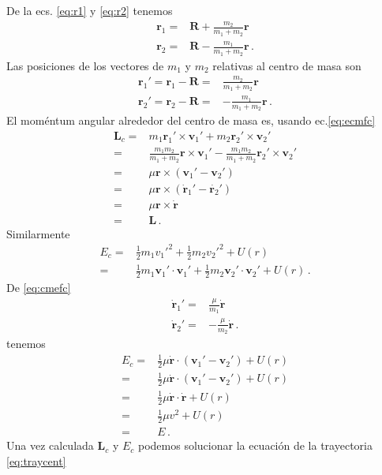 De la ecs. \eqref{eq:r1} y \eqref{eq:r2} tenemos
\begin{align}
    \mathbf{r}_1=&\mathbf{R}+\frac{m_2}{m_1+m_2}\mathbf{r}\nonumber\\
    \mathbf{r}_2=&\mathbf{R}-\frac{m_1}{m_1+m_2}\mathbf{r}\,.
\end{align}
Las posiciones de los vectores de $m_1$ y $m_2$ relativas al centro de masa son
\begin{align}
  \label{eq:cmefc}
  \mathbf{r}_1'=\mathbf{r}_1-\mathbf{R}=&\frac{m_2}{m_1+m_2}\mathbf{r}\nonumber\\
  \mathbf{r}_2'=\mathbf{r}_2-\mathbf{R}=&-\frac{m_1}{m_1+m_2}\mathbf{r}\,.
\end{align}
El moméntum angular alrededor del centro de masa es, usando ec.\eqref{eq:ecmfc}
\begin{align}
  \mathbf{L}_c=&m_1\mathbf{r}_1'\times \mathbf{v}_1'+m_2\mathbf{r}_2'\times \mathbf{v}_2'\nonumber\\
=&\frac{m_1m_2}{m_1+m_2}\mathbf{r}\times \mathbf{v}_1'-\frac{m_1m_2}{m_1+m_2}\mathbf{r}_2'\times \mathbf{v}_2'\nonumber\\
=&\mu \mathbf{r}\times(\mathbf{v}_1'-\mathbf{v}_2')\nonumber\\
=&\mu \mathbf{r}\times(\dot{\mathbf{r}}_1'-\dot{\mathbf{r}_2}')\nonumber\\
=&\mu \mathbf{r}\times\dot{\mathbf{r}}\nonumber\\
=&\mathbf{L}\,.
\end{align}
Similarmente
\begin{align}
  E_c=&\tfrac{1}{2}m_1{v_1'}^2+\tfrac{1}{2}m_2{v_2'}^2+U(r)\nonumber\\
=&\tfrac{1}{2}m_1\mathbf{v}_1'\cdot\mathbf{v}_1'+\tfrac{1}{2}m_2\mathbf{v}_2'\cdot\mathbf{v}_2'+U(r)\,.
\end{align}
De \eqref{eq:cmefc}
\begin{align}
    \dot{\mathbf{r}}_1'=&\frac{\mu}{m_1}\dot{\mathbf{r}}\nonumber\\
  \dot{\mathbf{r}}_2'=&-\frac{\mu}{m_2}\dot{\mathbf{r}}\,.
\end{align}
tenemos
\begin{align}
  E_c=&\tfrac{1}{2}\mu \dot{\mathbf{r}}\cdot(\mathbf{v}_1'-\mathbf{v}_2')+U(r)\nonumber\\
  =&\tfrac{1}{2}\mu \dot{\mathbf{r}}\cdot(\mathbf{v}_1'-\mathbf{v}_2')+U(r)\nonumber\\
  =&\tfrac{1}{2}\mu \dot{\mathbf{r}}\cdot\dot{\mathbf{r}}+U(r)\nonumber\\
  =&\tfrac{1}{2}\mu v^2+U(r)\nonumber\\
  =&E\,.
\end{align}
Una vez calculada $\mathbf{L}_c$ y $E_c$ podemos solucionar la ecuación de la trayectoria \eqref{eq:traycent}

